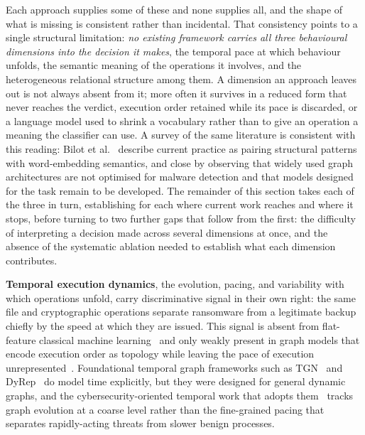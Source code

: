 \documentclass[%
    BCOR=10mm,
    DIV=13,
    toc=bibliography,
    toc=listof,
    oneside,
    12pt,
]{scrbook}
\begin{document}
Each approach supplies some of these and none supplies all, and the shape of
what is missing is consistent rather than incidental. That consistency points
to a single structural limitation: \emph{no existing framework carries all
three behavioural dimensions into the decision it makes}, the temporal pace at
which behaviour unfolds, the semantic meaning of the operations it involves,
and the heterogeneous relational structure among them. A dimension an approach
leaves out is not always absent from it; more often it survives in a reduced
form that never reaches the verdict, execution order retained while its pace is
discarded, or a language model used to shrink a vocabulary rather than to give
an operation a meaning the classifier can use. A survey of the same literature
is consistent with this reading: Bilot et al.~\cite{bilot2024survey} describe
current practice as pairing structural patterns with word-embedding semantics,
and close by observing that widely used graph architectures are not optimised
for malware detection and that models designed for the task remain to be
developed. The remainder of this section takes each of the three in turn,
establishing for each where current work reaches and where it stops, before
turning to two further gaps that follow from the first: the difficulty of
interpreting a decision made across several dimensions at once, and the absence
of the systematic ablation needed to establish what each dimension contributes.

\textbf{Temporal execution dynamics}, the evolution, pacing, and variability with
which operations unfold, carry discriminative signal in their own right: the same
file and cryptographic operations separate ransomware from a legitimate backup
chiefly by the speed at which they are issued. This signal is absent from
flat-feature classical machine learning~\cite{ucci2019survey, ye2017survey} and only
weakly present in graph models that encode execution order as topology while
leaving the pace of execution unrepresented~\cite{amer2025graphshield,
bilot2024survey}. Foundational temporal
graph frameworks such as TGN~\cite{tgn2020} and DyRep~\cite{dyrep2019} do model time
explicitly, but they were designed for general dynamic graphs, and the
cybersecurity-oriented temporal work that adopts them~\cite{guopope2023,
haghshenas2023temporal} tracks graph evolution at a coarse level rather than the
fine-grained pacing that separates rapidly-acting threats from slower benign
processes.
\end{document}

